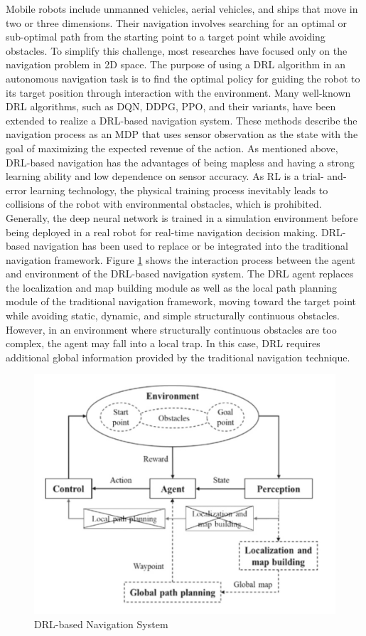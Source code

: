 Mobile robots include unmanned vehicles, aerial vehicles, and ships that move in two or three dimensions. Their navigation involves searching for an optimal or sub-optimal path from the starting point to a target point while avoiding obstacles. To simplify this challenge, most researches have focused only on the navigation problem in 2D space.
The purpose of using a DRL algorithm in an autonomous navigation task is to find the optimal policy for guiding the robot to its target position through interaction with the environment. Many well-known DRL algorithms, such as DQN\cite{mnih2013}, DDPG\cite{lilli2015}, PPO\cite{schulman2017}, and their variants, have been extended to realize a DRL-based navigation system. These methods describe the navigation process as an MDP that uses sensor observation as the state with the goal of maximizing the expected revenue of the action. As mentioned above, DRL-based navigation has the advantages of being mapless and having a strong learning ability and low dependence on sensor accuracy. As RL is a trial- and-error learning technology, the physical training process inevitably leads to collisions of the robot with environmental obstacles, which is prohibited. Generally, the deep neural network is trained in a simulation environment before being deployed in a real robot for real-time navigation decision making.
DRL-based navigation has been used to replace or be integrated into the traditional navigation framework. Figure \ref{fig:DRLNavSys} shows the interaction process between the agent and environment of the DRL-based navigation system. The DRL agent replaces the localization and map building module as well as the local path planning module of the traditional navigation framework, moving toward the target point while avoiding static, dynamic, and simple structurally continuous obstacles. However, in an environment where structurally continuous obstacles are too complex, the agent may fall into a local trap. In this case, DRL requires additional global information provided by the traditional navigation technique.
 
\begin{figure}[h!]
	\centering
	\includegraphics[width=0.8\linewidth]{figures/drl-based-nav.png}
	\caption{DRL-based Navigation System}
	\label{fig:DRLNavSys}
\end{figure}


